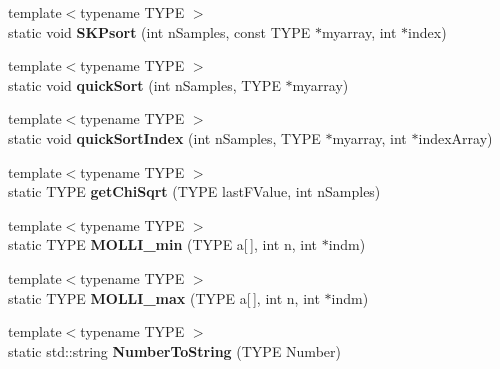 \begin{DoxyCompactItemize}
\item 
\hypertarget{class_k_w_util_adea3028ddaac44e13ab60460b0e50452}{{\footnotesize template$<$typename T\-Y\-P\-E $>$ }\\static void {\bfseries S\-K\-Psort} (int n\-Samples, const T\-Y\-P\-E $\ast$myarray, int $\ast$index)}\label{class_k_w_util_adea3028ddaac44e13ab60460b0e50452}

\item 
\hypertarget{class_k_w_util_aacc2b444dd10145dea4367714527efa9}{{\footnotesize template$<$typename T\-Y\-P\-E $>$ }\\static void {\bfseries quick\-Sort} (int n\-Samples, T\-Y\-P\-E $\ast$myarray)}\label{class_k_w_util_aacc2b444dd10145dea4367714527efa9}

\item 
\hypertarget{class_k_w_util_aba1906d9b0de1262e0ce837b15e8401f}{{\footnotesize template$<$typename T\-Y\-P\-E $>$ }\\static void {\bfseries quick\-Sort\-Index} (int n\-Samples, T\-Y\-P\-E $\ast$myarray, int $\ast$index\-Array)}\label{class_k_w_util_aba1906d9b0de1262e0ce837b15e8401f}

\item 
\hypertarget{class_k_w_util_a2e55b0bcf1bbf1155654b748a7064cbf}{{\footnotesize template$<$typename T\-Y\-P\-E $>$ }\\static T\-Y\-P\-E {\bfseries get\-Chi\-Sqrt} (T\-Y\-P\-E last\-F\-Value, int n\-Samples)}\label{class_k_w_util_a2e55b0bcf1bbf1155654b748a7064cbf}

\item 
\hypertarget{class_k_w_util_a6401111c5ce49eb97e1c79bae84b3868}{{\footnotesize template$<$typename T\-Y\-P\-E $>$ }\\static T\-Y\-P\-E {\bfseries M\-O\-L\-L\-I\-\_\-min} (T\-Y\-P\-E a\mbox{[}$\,$\mbox{]}, int n, int $\ast$indm)}\label{class_k_w_util_a6401111c5ce49eb97e1c79bae84b3868}

\item 
\hypertarget{class_k_w_util_af0fee5e9d89e7c029c346804480d5832}{{\footnotesize template$<$typename T\-Y\-P\-E $>$ }\\static T\-Y\-P\-E {\bfseries M\-O\-L\-L\-I\-\_\-max} (T\-Y\-P\-E a\mbox{[}$\,$\mbox{]}, int n, int $\ast$indm)}\label{class_k_w_util_af0fee5e9d89e7c029c346804480d5832}

\item 
\hypertarget{class_k_w_util_a10aaa83c83c801ef07c95a29e1acdc4e}{{\footnotesize template$<$typename T\-Y\-P\-E $>$ }\\static std\-::string {\bfseries Number\-To\-String} (T\-Y\-P\-E Number)}\label{class_k_w_util_a10aaa83c83c801ef07c95a29e1acdc4e}


\end{DoxyCompactItemize}
